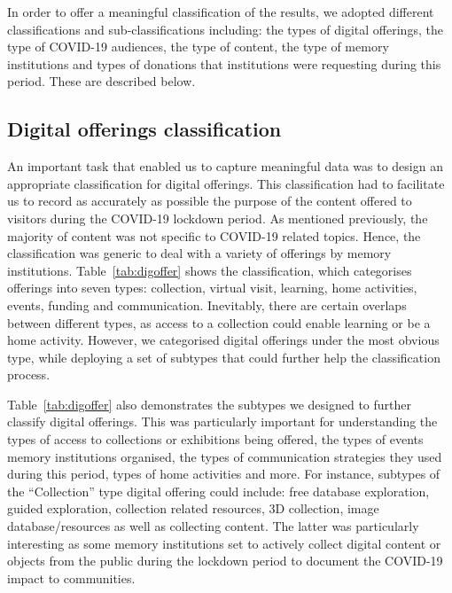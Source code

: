 \documentclass{egpubl}
\begin{document}

In order to offer a meaningful classification of the results, we adopted different classifications and sub-classifications including: the types of digital offerings, the type of COVID-19 audiences, the type of content, the type of memory institutions and types of donations that institutions were requesting during this period. These are described below.

\subsection{Digital offerings classification}
\label{off}
An important task that enabled us to capture meaningful data was to design an appropriate classification for digital offerings. This classification had to facilitate us to record as accurately as possible the purpose of the content offered to visitors during the COVID-19 lockdown period. As mentioned previously, the majority of content was not specific to COVID-19 related topics. Hence, the classification was generic to deal with a variety of offerings by memory institutions. Table~\ref{tab:digoffer} shows the classification, which categorises offerings into seven types: collection, virtual visit, learning, home activities, events, funding and communication. Inevitably, there are certain overlaps between different types, as access to a collection could enable learning or be a home activity. However, we categorised digital offerings %
under the most obvious type, while deploying a set of subtypes that could further help the classification process.

Table~\ref{tab:digoffer} also demonstrates the subtypes we designed to further classify digital offerings. This was particularly important for understanding the types of access to collections or exhibitions being offered, the types of events memory institutions organised, the types of communication strategies they used during this period, types of home activities and more. For instance, subtypes of the ``Collection'' type digital offering could include: free database exploration, guided exploration, collection related resources, 3D collection, image database/resources as well as collecting content. The latter was particularly interesting as some memory institutions set to actively collect digital content or objects from the public during the lockdown period to document the COVID-19 impact to communities.
\end{document}
